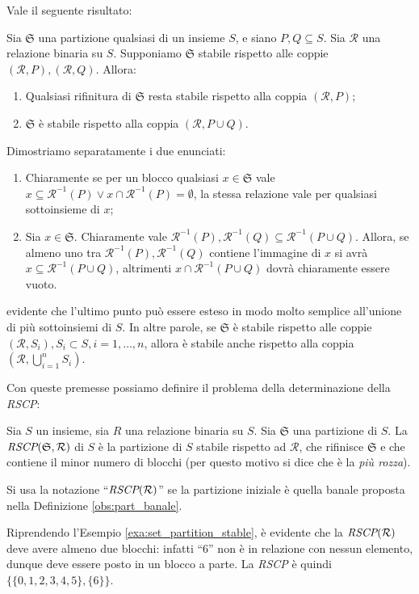 Vale il seguente risultato:
\begin{proposition}
    Sia $\mathfrak{S}$ una partizione qualsiasi di un insieme $S$, e siano $P,Q \subseteq S$. Sia $\mathcal{R}$ una relazione binaria su $S$. Supponiamo $\mathfrak{S}$ stabile rispetto alle coppie $(\mathcal{R},P),(\mathcal{R},Q)$. Allora:
    \begin{enumerate}
        \item Qualsiasi rifinitura di $\mathfrak{S}$ resta stabile rispetto alla coppia $(\mathcal{R},P)$;
        \item $\mathfrak{S}$ è stabile rispetto alla coppia $(\mathcal{R},P \cup Q)$.
    \end{enumerate}
\end{proposition}
\begin{proof2}
    Dimostriamo separatamente i due enunciati:
    \begin{enumerate}
        \item Chiaramente se per un blocco qualsiasi $x \in \mathfrak{S}$ vale $x \subseteq \mathcal{R}^{-1}(P) \lor x \cap \mathcal{R}^{-1}(P) = \emptyset$, la stessa relazione vale per qualsiasi sottoinsieme di $x$;
        \item Sia $x \in \mathfrak{S}$. Chiaramente vale $\mathcal{R}^{-1}(P),\mathcal{R}^{-1}(Q) \subseteq \mathcal{R}^{-1}(P \cup Q)$. Allora, se almeno uno tra $\mathcal{R}^{-1}(P),\mathcal{R}^{-1}(Q)$ contiene l'immagine di $x$ si avrà $x \subseteq \mathcal{R}^{-1}(P \cup Q)$, altrimenti $x \cap \mathcal{R}^{-1}(P \cup Q)$ dovrà chiaramente essere vuoto.
    \end{enumerate}
    \vspace*{-0.75cm}
\end{proof2}

\accente evidente che l'ultimo punto può essere esteso in modo molto semplice all'unione di più sottoinsiemi di $S$. In altre parole, se $\mathfrak{S}$ è stabile rispetto alle coppie $(\mathcal{R},S_i), S_i \subset S, i = 1, \dots, n$, allora è stabile anche rispetto alla coppia $(\mathcal{R}, \bigcup_{i=1}^{n} S_i)$.

Con queste premesse possiamo definire il problema della determinazione della \emph{RSCP}:
\begin{definition}
    Sia $S$ un insieme, sia $R$ una relazione binaria su $S$. Sia $\mathfrak{S}$ una partizione di $S$. La $\emph{RSCP}(\mathfrak{S},\mathcal{R})$ di $S$ è la partizione di $S$ stabile rispetto ad $\mathcal{R}$, che rifinisce $\mathfrak{S}$ e che contiene il minor numero di blocchi (per questo motivo si dice che è la \emph{più rozza}).

    Si usa la notazione ``$\emph{RSCP}(\mathcal{R})$'' se la partizione iniziale è quella banale proposta nella Definizione \ref{obs:part_banale}.
\end{definition}
\begin{example}
    Riprendendo l'Esempio \ref*{exa:set_partition_stable}, è evidente che la $\emph{RSCP}(\mathcal{R})$ deve avere almeno due blocchi: infatti ``6'' non è in relazione con nessun elemento, dunque deve essere posto in un blocco a parte. La \emph{RSCP} è quindi $\{\{0,1,2,3,4,5\},\{6\}\}$.
\end{example}

